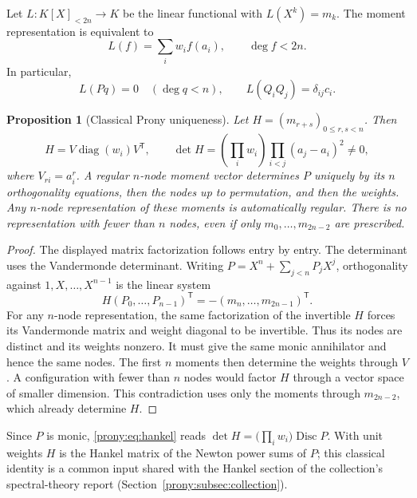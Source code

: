 \documentclass[11pt,letterpaper]{article}
\newtheorem{proposition}[theorem]{Proposition}
\theoremstyle{definition}
\theoremstyle{remark}
\DeclareMathOperator{\diag}{diag}
\DeclareMathOperator{\Disc}{Disc}
\begin{document}
Let $L:K[X]_{<2n}\to K$ be the linear functional with $L(X^k)=m_k$.
The moment representation is equivalent to
\[
 L(f)=\sum_i w_i f(a_i),\qquad \deg f<2n.
\]
In particular,
\begin{equation}\label{prony:eq:orthog}
 L(Pq)=0\quad(\deg q<n),\qquad
 L(Q_iQ_j)=\delta_{ij}c_i.
\end{equation}

\begin{proposition}[Classical Prony uniqueness]\label{prony:prop:prony}
Let $H=(m_{r+s})_{0\le r,s<n}$. Then
\begin{equation}\label{prony:eq:hankel}
 H=V\diag(w_i)V^{\mathsf T},\qquad
 \det H=\left(\prod_iw_i\right)\prod_{i<j}(a_j-a_i)^2\ne0,
\end{equation}
where $V_{ri}=a_i^r$. A regular $n$-node moment vector determines $P$
uniquely by its $n$ orthogonality equations, then the nodes up to permutation,
and then the weights. Any $n$-node representation of these moments is
automatically regular. There is no representation with fewer than $n$ nodes,
even if only $m_0,\ldots,m_{2n-2}$ are prescribed.
\end{proposition}
\begin{proof}
The displayed matrix factorization follows entry by entry. The determinant
uses the Vandermonde determinant. Writing
$P=X^n+\sum_{j<n}P_jX^j$, orthogonality against $1,X,\ldots,X^{n-1}$
is the linear system
\[
 H(P_0,\ldots,P_{n-1})^{\mathsf T}
 =-(m_n,\ldots,m_{2n-1})^{\mathsf T}.
\]
For any $n$-node representation, the same factorization of the invertible
$H$ forces its Vandermonde matrix and weight diagonal to be invertible.
Thus its nodes are distinct and its weights nonzero. It must give the
same monic annihilator and hence the same nodes. The first $n$ moments then determine
the weights through $V$. A configuration with fewer than $n$ nodes would
factor $H$ through a vector space of smaller dimension. This contradiction
uses only the moments through $m_{2n-2}$, which already determine $H$.
\end{proof}
Since $P$ is monic, \eqref{prony:eq:hankel} reads
$\det H=\bigl(\prod_iw_i\bigr)\Disc P$. With unit weights $H$ is the Hankel
matrix of the Newton power sums of $P$; this classical identity is a
common input shared with the Hankel section of the collection's spectral-theory
report (Section~\ref{prony:subsec:collection}).
\end{document}
